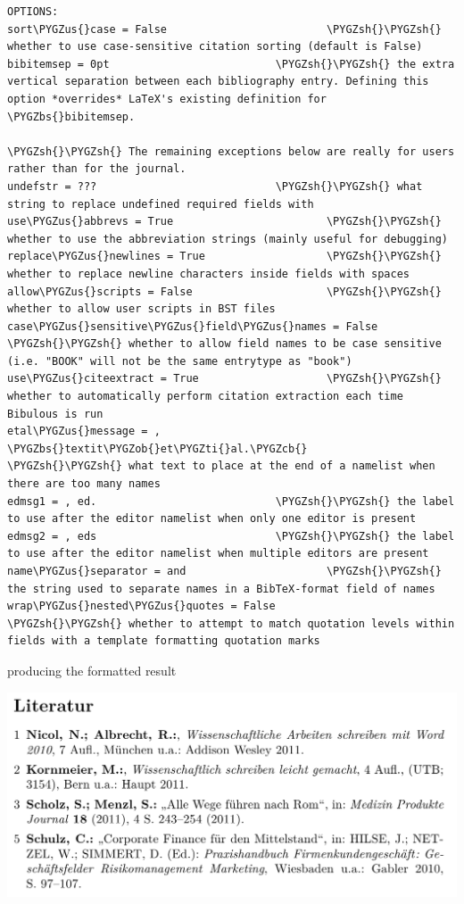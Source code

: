 \documentclass[letterpaper,10pt,english]{sphinxmanual}
\def\PYGZbs{\char`\\}
\def\PYGZus{\char`\_}
\def\PYGZob{\char`\{}
\def\PYGZcb{\char`\}}
\def\PYGZsh{\char`\#}
\def\PYGZti{\char`\~}
\begin{document}
\begin{Verbatim}[commandchars=\\\{\}]
OPTIONS:
sort\PYGZus{}case = False                         \PYGZsh{}\PYGZsh{} whether to use case-sensitive citation sorting (default is False)
bibitemsep = 0pt                          \PYGZsh{}\PYGZsh{} the extra vertical separation between each bibliography entry. Defining this option *overrides* LaTeX's existing definition for \PYGZbs{}bibitemsep.

\PYGZsh{}\PYGZsh{} The remaining exceptions below are really for users rather than for the journal.
undefstr = ???                            \PYGZsh{}\PYGZsh{} what string to replace undefined required fields with
use\PYGZus{}abbrevs = True                        \PYGZsh{}\PYGZsh{} whether to use the abbreviation strings (mainly useful for debugging)
replace\PYGZus{}newlines = True                   \PYGZsh{}\PYGZsh{} whether to replace newline characters inside fields with spaces
allow\PYGZus{}scripts = False                     \PYGZsh{}\PYGZsh{} whether to allow user scripts in BST files
case\PYGZus{}sensitive\PYGZus{}field\PYGZus{}names = False        \PYGZsh{}\PYGZsh{} whether to allow field names to be case sensitive (i.e. "BOOK" will not be the same entrytype as "book")
use\PYGZus{}citeextract = True                    \PYGZsh{}\PYGZsh{} whether to automatically perform citation extraction each time Bibulous is run
etal\PYGZus{}message = , \PYGZbs{}textit\PYGZob{}et\PYGZti{}al.\PYGZcb{}          \PYGZsh{}\PYGZsh{} what text to place at the end of a namelist when there are too many names
edmsg1 = , ed.                            \PYGZsh{}\PYGZsh{} the label to use after the editor namelist when only one editor is present
edmsg2 = , eds                            \PYGZsh{}\PYGZsh{} the label to use after the editor namelist when multiple editors are present
name\PYGZus{}separator = and                      \PYGZsh{}\PYGZsh{} the string used to separate names in a BibTeX-format field of names
wrap\PYGZus{}nested\PYGZus{}quotes = False                \PYGZsh{}\PYGZsh{} whether to attempt to match quotation levels within fields with a template formatting quotation marks
\end{Verbatim}

producing the formatted result

\includegraphics[width=0.600\linewidth]{example5b.png}
\end{document}
